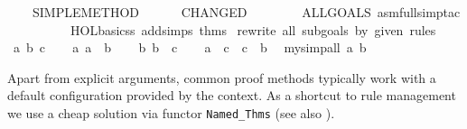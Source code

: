 \begin{isabellebody}
\ \ \ \ SIMPLE{}METHOD\isanewline
\ \ \ \ \ \ {}CHANGED\isanewline
\ \ \ \ \ \ \ \ {}ALLGOALS\ {}asm{}full{}simp{}tac\isanewline
\ \ \ \ \ \ \ \ \ \ {}HOL{}basic{}ss\ addsimps\ thms{}{}{}{}{}\isanewline
{}\ {}rewrite\ all\ subgoals\ by\ given\ rules{}%
\endisatagML
{\isafoldML}%
%
\isadelimML
%
\endisadelimML
\isanewline
\isanewline
{}\isamarkupfalse%
\isanewline
%
\isadelimproof
\ \ %
\endisadelimproof
%
\isatagproof
{}\isamarkupfalse%
\ a\ b\ c\isanewline
\ \ \isamarkupfalse%
\ a{}\ {}a\ {}\ b{}\isanewline
\ \ \isamarkupfalse%
\ b{}\ {}b\ {}\ c{}\isanewline
\ \ \isamarkupfalse%
\ {}a\ {}\ c{}\ \ {}c\ {}\ b{}\ \isamarkupfalse%
\ {}my{}simp{}all\ a\ b{}\isanewline
\isanewline
{}\isamarkupfalse%
%
\endisatagproof
{\isafoldproof}%
%
\isadelimproof
%
\endisadelimproof
%
\begin{isamarkuptext}%
\medskip Apart from explicit arguments, common proof methods
  typically work with a default configuration provided by the context.
  As a shortcut to rule management we use a cheap solution via functor
  \verb|Named_Thms| (see also \hyperlink{file.~~/src/Pure/Tools/named-thms.ML}{\mbox{}}).%

\end{isamarkuptext}
\end{isabellebody}
